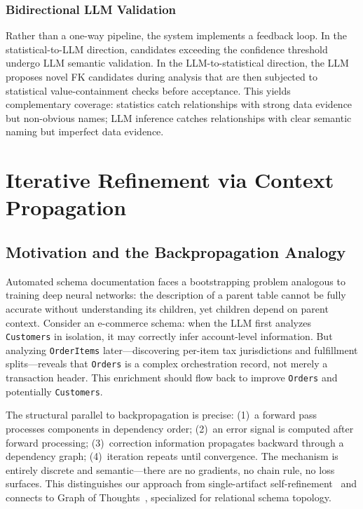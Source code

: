 \documentclass[twocolumn]{svjour3}
\begin{document}
\subsubsection{Bidirectional LLM Validation}

Rather than a one-way pipeline, the system implements a feedback loop. In the statistical-to-LLM direction, candidates exceeding the confidence threshold undergo LLM semantic validation. In the LLM-to-statistical direction, the LLM proposes novel FK candidates during analysis that are then subjected to statistical value-containment checks before acceptance. This yields complementary coverage: statistics catch relationships with strong data evidence but non-obvious names; LLM inference catches relationships with clear semantic naming but imperfect data evidence.


\section{Iterative Refinement via Context Propagation}\label{sec:iterative}

\subsection{Motivation and the Backpropagation Analogy}

Automated schema documentation faces a bootstrapping problem analogous to training deep neural networks: the description of a parent table cannot be fully accurate without understanding its children, yet children depend on parent context. Consider an e-commerce schema: when the LLM first analyzes \texttt{Customers} in isolation, it may correctly infer account-level information. But analyzing \texttt{OrderItems} later---discovering per-item tax jurisdictions and fulfillment splits---reveals that \texttt{Orders} is a complex orchestration record, not merely a transaction header. This enrichment should flow back to improve \texttt{Orders} and potentially \texttt{Customers}.

The structural parallel to backpropagation is precise: (1)~a forward pass processes components in dependency order; (2)~an error signal is computed after forward processing; (3)~correction information propagates backward through a dependency graph; (4)~iteration repeats until convergence. The mechanism is entirely discrete and semantic---there are no gradients, no chain rule, no loss surfaces. This distinguishes our approach from single-artifact self-refinement~\cite{madaan2023selfrefine,shinn2023reflexion} and connects to Graph of Thoughts~\cite{besta2024got}, specialized for relational schema topology.
\end{document}
